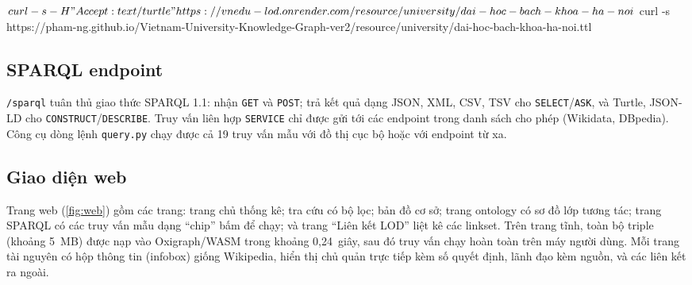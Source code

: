 \documentclass[12pt,a4paper]{article}
\begin{document}
\begin{code}
$ curl -s -H "Accept: text/turtle" https://vnedu-lod.onrender.com/resource/university/dai-hoc-bach-khoa-ha-noi
$ curl -s https://pham-ng.github.io/Vietnam-University-Knowledge-Graph-ver2/resource/university/dai-hoc-bach-khoa-ha-noi.ttl
\end{code}

\subsection{SPARQL endpoint}
\texttt{/sparql} tuân thủ giao thức SPARQL 1.1: nhận \texttt{GET} và \texttt{POST}; trả kết quả dạng JSON, XML, CSV,
TSV cho \texttt{SELECT}/\texttt{ASK}, và Turtle, JSON-LD cho \texttt{CONSTRUCT}/\texttt{DESCRIBE}. Truy vấn liên hợp
\texttt{SERVICE} chỉ được gửi tới các endpoint trong danh sách cho phép (Wikidata, DBpedia). Công cụ dòng lệnh
\texttt{query.py} chạy được cả 19 truy vấn mẫu với đồ thị cục bộ hoặc với endpoint từ xa.

\subsection{Giao diện web}
Trang web (\cref{fig:web}) gồm các trang: trang chủ thống kê; tra cứu có bộ lọc; bản đồ cơ sở; trang ontology có sơ đồ
lớp tương tác; trang SPARQL có các truy vấn mẫu dạng ``chip'' bấm để chạy; và trang ``Liên kết LOD'' liệt kê các
linkset. Trên trang tĩnh, toàn bộ \metricUnionTriples{} triple (khoảng 5~MB) được nạp vào Oxigraph/WASM trong khoảng
0,24~giây, sau đó truy vấn chạy hoàn toàn trên máy người dùng. Mỗi trang tài nguyên có hộp thông tin (infobox) giống
Wikipedia, hiển thị chủ quản trực tiếp kèm số quyết định, lãnh đạo kèm nguồn, và các liên kết ra ngoài.
\end{document}
